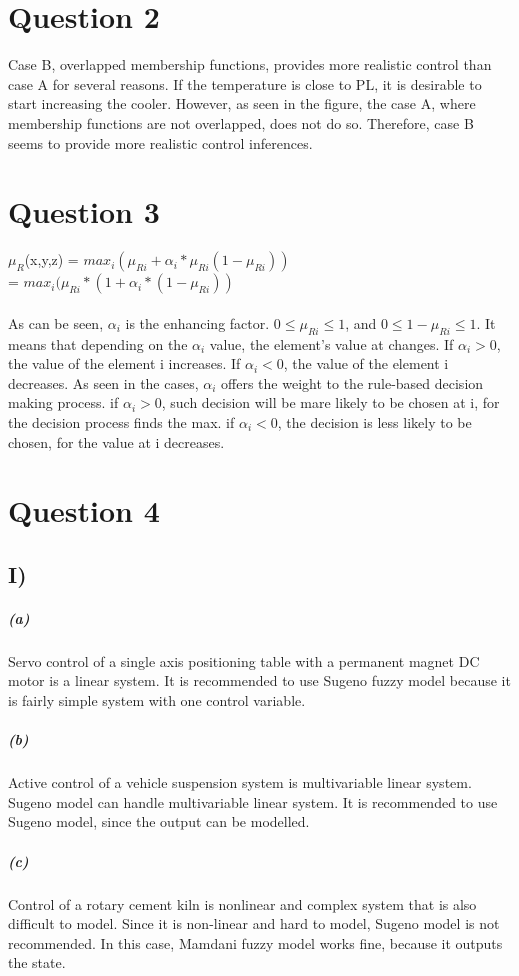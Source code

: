 \documentclass[12pt, letterpaper]{article}
\begin{document}
\pagebreak

\section*{Question 2}

Case B, overlapped membership functions, provides more realistic control than case A for several reasons. If the temperature is close to PL, it is desirable to start increasing the cooler. However, as seen in the figure, the case A, where membership functions are not overlapped, does not do so. Therefore, case B seems to provide more realistic control inferences.

\pagebreak

\section*{Question 3}

$\mu_R$(x,y,z) = $max_i(\mu_{Ri} + \alpha_i * \mu_{Ri} (1-\mu_{Ri}))$ \\
= $max_i(\mu_{Ri} * (1 + \alpha_i * (1-\mu_{Ri}))$
\\\\
As can be seen, $\alpha_i$ is the enhancing factor. $0 \le \mu_{Ri} \le 1$, and $0 \le 1-\mu_{Ri} \le 1$. It means that depending on the $\alpha_i$ value, the element's value at changes. If $\alpha_i > 0$, the value of the element i increases. If $\alpha_i < 0$, the value of the element i decreases. As seen in the cases, $\alpha_i$ offers the weight to the rule-based decision making process. if $\alpha_i > 0$, such decision will be mare likely to be chosen at i, for the decision process finds the max. if $\alpha_i < 0$, the decision is less likely to be chosen, for the value at i decreases.

\pagebreak

\section*{Question 4}

\subsection*{I)}
\subparagraph*{(a)}
Servo control of a single axis positioning table with a permanent magnet DC motor is a linear system. It is recommended to use Sugeno fuzzy model because it is fairly simple system with one control variable.
\subparagraph*{(b)}
Active control of a vehicle suspension system is multivariable linear system. Sugeno model can handle multivariable linear system. It is recommended to use Sugeno model, since the output can be modelled.
\subparagraph*{(c)}
Control of a rotary cement kiln is nonlinear and complex system that is also difficult to model. Since it is non-linear and hard to model, Sugeno model is not recommended. In this case, Mamdani fuzzy model works fine, because it outputs the state.
\end{document}

